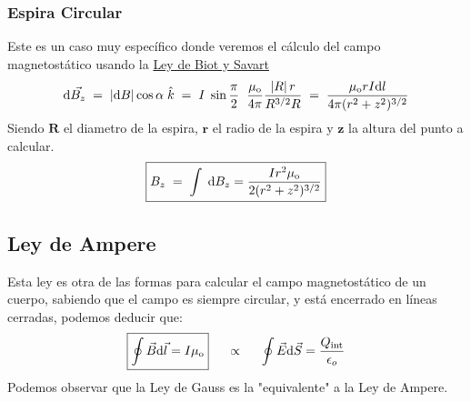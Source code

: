 \subsubsection{Espira Circular}
\begin{wrapfigure}{r}{4cm}
\end{wrapfigure}
\noindent Este es un caso muy específico donde veremos el cálculo del campo magnetostático usando la \underline{Ley de Biot y Savart}
\[
        \mathrm{d}\vec{B_z}\hspace{1mm}=\hspace{1mm}\left | \mathrm{d}B \right |\cos{\alpha}\hspace{1mm}\hat{k} \hspace{1mm}=\hspace{1mm} I\hspace{1mm}\sin{\frac{\pi}{2}}\hspace{2mm}\frac{\mu_{\textnormal{o}}}{4\pi} \frac{\left | R \right  |r}{R^{3/2}R}\hspace{1mm}=\hspace{1mm}\frac{\mu_{\textnormal{o}}rI\mathrm{d}l}{4\pi(r^2+z^2)^{3/2}}
\]
\noindent Siendo \(\mathbf{R}\) el diametro de la espira, \(\mathbf{r}\) el radio de la espira y \(\mathbf{z}\) la altura del punto a calcular.
\[
        \boxed{B_z \hspace{1mm} = \hspace{1mm}\int \hspace{1mm} \mathrm{d}B_z = \frac{Ir^2\mu_{\textnormal{o}}}{2(r^2+z^2)^{3/2}}}
\]
\subsection{Ley de Ampere}
\noindent Esta ley es otra de las formas para calcular el campo magnetostático de un cuerpo, sabiendo que el campo es siempre circular, y está encerrado en líneas cerradas, podemos deducir que:
\[
        \boxed{\oint \vec{B}\mathrm{d}\vec{l} = I\mu_{\textnormal{o}}} \hspace{.5cm} \propto \hspace{.5cm} \oint \vec{E}\mathrm{d}\vec{S} = \frac{Q_\textnormal{int}}{\epsilon_o}
\]
\noindent Podemos observar que la Ley de Gauss es la "equivalente" a la Ley de Ampere.
